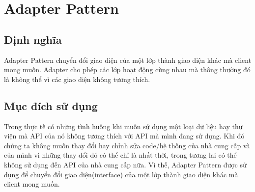 \chapter{Adapter Pattern}


\section{Định nghĩa}
Adapter Pattern chuyển đổi giao diện của một lớp thành giao diện khác mà client mong muốn. Adapter cho phép các lớp hoạt động cùng nhau mà thông thường đó là không thể vì các giao diện không tương thích.

\section{Mục đích sử dụng}
Trong thực tế có những tình huống khi muốn sử dụng một loại dữ liệu hay thư viện mà API của nó không tương thích với API mà mình đang sử dụng. Khi đó chúng ta không muốn thay đổi hay chỉnh sửa code/hệ thống của nhà cung cấp và của mình vì những thay đổi đó có thể chỉ là nhất thời, trong tương lai có thể không sử dụng đến API của nhà cung cấp nữa. Vì thế, Adapter Pattern được sử dụng để chuyển đổi giao diện(interface) của một lớp thành giao diện khác mà client mong muốn.

